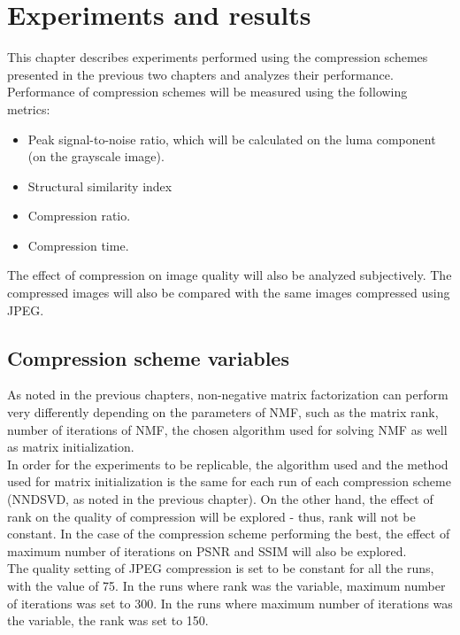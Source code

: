 \documentclass[thesis=M,english]{FITthesis}[2012/10/20]
\begin{document}
\chapter{Experiments and results}
\label{ch:tests}
This chapter describes experiments performed using the compression schemes
presented in the previous two chapters and analyzes their performance. Performance of
compression schemes will be measured using the following metrics:
\begin{itemize}
  \item Peak signal-to-noise ratio, which will be calculated on the luma component
  (on the grayscale image).
  \item Structural similarity index
  \item Compression ratio.
  \item Compression time.
\end{itemize}
The effect of compression on image quality will also be analyzed subjectively.
The compressed images will also be compared with the same images compressed using
JPEG.


\section{Compression scheme variables}
As noted in the previous chapters, non-negative matrix factorization can perform
very differently depending on the parameters of NMF, such as the matrix rank,
number of iterations of NMF, the chosen algorithm used for solving NMF as well
as matrix initialization.
\\

In order for the experiments to be replicable, the algorithm used and the
method used for matrix initialization is the same for each run of each
compression scheme (NNDSVD, as noted in the previous chapter). On the other hand,
the effect of rank on the quality of compression will be explored - thus, rank will
not be constant. In the case of the compression scheme performing the best, the effect
of maximum number of iterations on PSNR and SSIM will also be explored.
\\

The quality setting of JPEG compression is set to be constant for all the runs, with the value
of 75. In the runs where rank was the variable, maximum number of iterations was set to
300. In the runs where maximum number of iterations was the variable, the rank was set
to 150.
\end{document}
